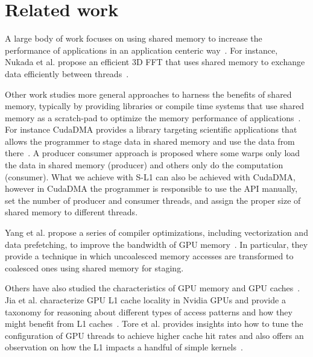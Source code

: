 \section{Related work}
\label{sec:related}

A large body of work focuses on using shared memory to increase the performance of applications in
an application centeric way~\cite{che2009rodinia, tolke2008teraflop, suchard2010understanding, walters2009evaluating,
rodrigues2008gpu, lin2010accelerating, Khorasanigpu}. For instance, Nukada et al. propose an
efficient 3D FFT that uses shared memory to exchange data efficiently between threads~\cite{fftgpu}.

Other work studies more general approaches to harness the benefits of shared memory, typically by
providing libraries or compile time systems that use shared memory as a scratch-pad to optimize the
memory performance of applications~\cite{Baskaran, YangCompiler, ueng2008cuda, Khangpu, moazeni2009memory,
ji2011using}.
For instance CudaDMA provides a library targeting scientific applications that allows the programmer
to stage data in shared memory and use the data from there~\cite{bauer2011cudadma}. A producer
consumer approach is proposed where some warps only load the data in shared memory (producer)
and others only do the computation (consumer). What we achieve with S-L1 can also be achieved with
CudaDMA, however in CudaDMA the programmer is responsible to use the API manually, set the number of
producer and consumer threads, and assign the proper size of shared memory to different threads.

Yang et al. propose a series of compiler optimizations, including vectorization and data
prefetching, to improve the bandwidth of GPU memory~\cite{YangCompiler}. In particular, they provide
a technique in which uncoalesced memory accesses are transformed to coalesced ones using shared
memory for staging.

Others have also studied the characteristics of GPU memory and GPU
caches~\cite{wongDomestifying, Gaurgpu}. Jia et al.
characterize GPU L1 cache locality in Nvidia GPUs and provide a taxonomy for reasoning about
different types of access patterns and how they might benefit from L1
caches~\cite{jia2012characterizing}.
Tore et al. provides insights into how to tune the configuration of GPU threads to achieve higher
cache hit rates and also offers an observation on how the L1 impacts a handful of simple
kernels~\cite{torres2011understanding}.



